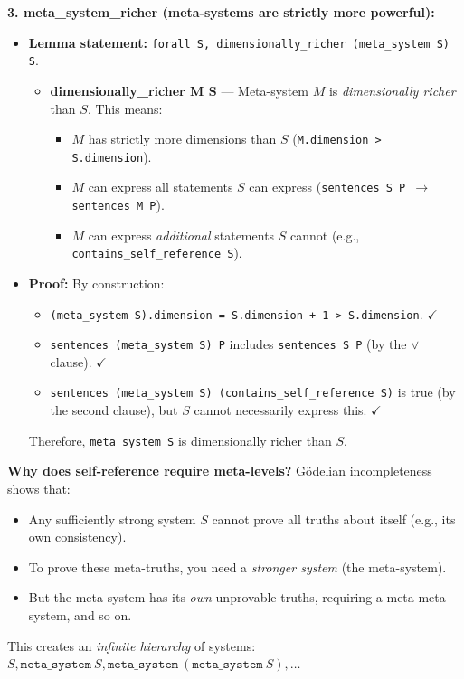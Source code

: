 \textbf{3. meta\_system\_richer (meta-systems are strictly more powerful):}
\begin{itemize}
    \item \textbf{Lemma statement:} \texttt{forall S, dimensionally\_richer (meta\_system S) S}.
    \begin{itemize}
        \item \textbf{dimensionally\_richer M S} — Meta-system $M$ is \textit{dimensionally richer} than $S$. This means:
        \begin{itemize}
            \item $M$ has strictly more dimensions than $S$ (\texttt{M.dimension > S.dimension}).
            \item $M$ can express all statements $S$ can express (\texttt{sentences S P $\to$ sentences M P}).
            \item $M$ can express \textit{additional} statements $S$ cannot (e.g., \texttt{contains\_self\_reference S}).
        \end{itemize}
    \end{itemize}
    
    \item \textbf{Proof:} By construction:
    \begin{itemize}
        \item \texttt{(meta\_system S).dimension = S.dimension + 1 > S.dimension}. $\checkmark$
        \item \texttt{sentences (meta\_system S) P} includes \texttt{sentences S P} (by the $\vee$ clause). $\checkmark$
        \item \texttt{sentences (meta\_system S) (contains\_self\_reference S)} is true (by the second clause), but $S$ cannot necessarily express this. $\checkmark$
    \end{itemize}
    Therefore, \texttt{meta\_system S} is dimensionally richer than $S$.
\end{itemize}

\textbf{Why does self-reference require meta-levels?} Gödelian incompleteness shows that:
\begin{itemize}
    \item Any sufficiently strong system $S$ cannot prove all truths about itself (e.g., its own consistency).
    \item To prove these meta-truths, you need a \textit{stronger system} (the meta-system).
    \item But the meta-system has its \textit{own} unprovable truths, requiring a meta-meta-system, and so on.
\end{itemize}
This creates an \textit{infinite hierarchy} of systems: $S, \texttt{meta\_system}\ S, \texttt{meta\_system}\ (\texttt{meta\_system}\ S), \ldots$

